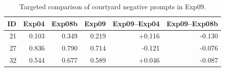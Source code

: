 \begin{table}[htbp]
\centering
\caption{Targeted comparison of courtyard negative prompts in Exp09.}
\label{tab:exp09_courtyard_negative_prompts}
\small
\begin{tabular}{rrrrrr}
\toprule
ID & Exp04 & Exp08b & Exp09 & Exp09--Exp04 & Exp09--Exp08b \\
\midrule
21 & 0.103 & 0.349 & 0.219 & +0.116 & -0.130 \\
27 & 0.836 & 0.790 & 0.714 & -0.121 & -0.076 \\
32 & 0.544 & 0.677 & 0.589 & +0.046 & -0.087 \\
\bottomrule
\end{tabular}
\end{table}
